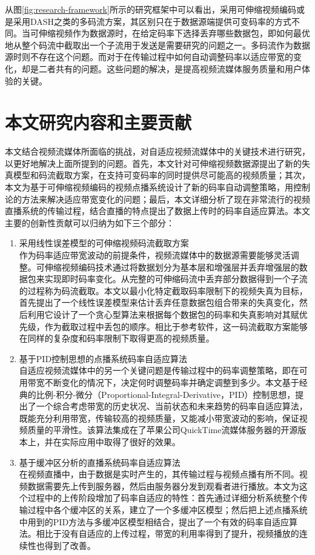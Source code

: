 从图\ref{fig:research-framework}所示的研究框架中可以看出，采用可伸缩视频编码或是采用DASH之类的多码流方案，其区别只在于数据源端提供可变码率的方式不同。当可伸缩视频作为数据源时，在给定码率下选择丢弃哪些数据包，即如何最优地从整个码流中截取出一个子流用于发送是需要研究的问题之一。多码流作为数据源时则不存在这个问题。而对于在传输过程中如何自动调整码率以适应带宽的变化，却是二者共有的问题。这些问题的解决，是提高视频流媒体服务质量和用户体验的关键。

\section{本文研究内容和主要贡献}

本文结合视频流媒体所面临的挑战，对自适应视频流媒体中的关键技术进行研究，以更好地解决上面所提到的问题。首先，本文针对可伸缩视频数据源提出了新的失真模型和码流截取方案，在支持可变码率的同时提供尽可能高的视频质量；其次，本文为基于可伸缩视频编码的视频点播系统设计了新的码率自动调整策略，用控制论的方法来解决适应带宽变化的问题；最后，本文详细分析了现在非常流行的视频直播系统的传输过程，结合直播的特点提出了数据上传时的码率自适应算法。本文主要的创新性贡献可以归纳为如下三个部分：
\begin{enumerate}
\item {采用线性误差模型的可伸缩视频码流截取方案}\\
作为码率适应带宽波动的前提条件，视频流媒体中的数据源需要能够灵活调整。可伸缩视频编码技术通过将数据划分为基本层和增强层并丢弃增强层的数据包来实现即时码率变化。从完整的可伸缩码流中丢弃部分数据得到一个子流的过程称为码流截取。本文以最小化特定截取码率限制下的视频失真为目标，首先提出了一个线性误差模型来估计丢弃任意数据包组合带来的失真变化，然后利用它设计了一个贪心型算法来根据每个数据包的码率和失真影响对其赋优先级，作为截取过程中丢包的顺序。相比于参考软件，这一码流截取方案能够在同样的复杂度和码率限制下取得更高的视频质量。
\vspace{10pt}
\item {基于PID控制思想的点播系统码率自适应算法}\\
自适应视频流媒体中的另一个关键问题是传输过程中的码率调整策略，即在可用带宽不断变化的情况下，决定何时调整码率并确定调整到多少。本文基于经典的比例-积分-微分（Proportional-Integral-Derivative，PID）控制思想，提出了一个综合考虑带宽的历史状况、当前状态和未来趋势的码率自适应算法，既能充分利用带宽，传输较高的视频质量，又能减小带宽波动的影响，保证视频质量的平滑性。该算法集成在了苹果公司QuickTime流媒体服务器的开源版本上，并在实际应用中取得了很好的效果。
\vspace{10pt}
\item {基于缓冲区分析的直播系统码率自适应算法}\\
在视频直播中，由于数据是实时产生的，其传输过程与视频点播有所不同。视频数据需要先上传到服务器，然后由服务器分发到观看者进行播放。本文为这个过程中的上传阶段增加了码率自适应的特性：首先通过详细分析系统整个传输过程中各个缓冲区的关系，建立了一个多缓冲区模型；然后把上述点播系统中用到的PID方法与多缓冲区模型相结合，提出了一个有效的码率自适应算法。相比于没有自适应的上传过程，带宽的利用率得到了提升，视频播放的连续性也得到了改善。
\end{enumerate}

